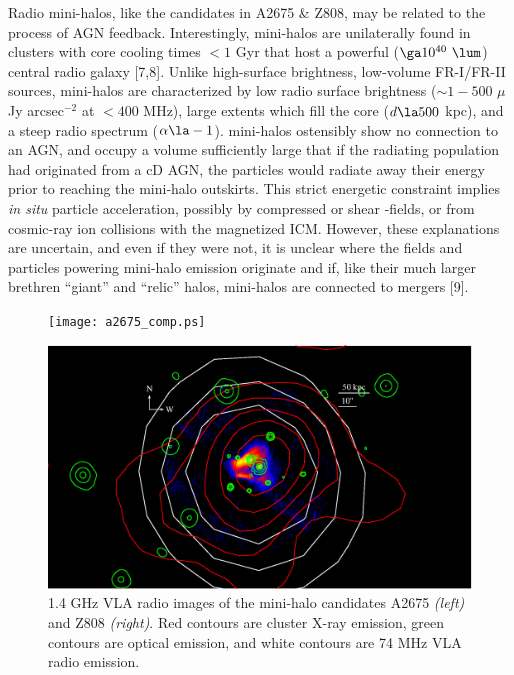 \documentclass[letterpaper,11pt]{article}
\begin{document}
Radio mini-halos, like the candidates in A2675 \& Z808, may be related to the
process of AGN feedback. Interestingly, mini-halos are unilaterally found in
clusters with core cooling times $< 1$ Gyr that host a powerful ($\ga
10^{40} ~\lum$) central radio galaxy [7,8]. Unlike high-surface
brightness, low-volume FR-I/FR-II sources, mini-halos are characterized by
low radio surface brightness ($\sim 1-500$ $\mu$Jy arcsec$^{-2}$ at $<
400$ MHz), large extents which fill the core ($d \la 500$ kpc), and a
steep radio spectrum ($\alpha \la -1$). mini-halos ostensibly show no
connection to an AGN, and occupy a volume sufficiently large that if
the radiating population had originated from a cD AGN, the particles
would radiate away their energy prior to reaching the mini-halo
outskirts. This strict energetic constraint implies {\it{in situ}}
particle acceleration, possibly by compressed or shear \bmag-fields,
or from cosmic-ray ion collisions with the magnetized ICM. However,
these explanations are uncertain, and even if they were not, it is
unclear where the fields and particles powering mini-halo emission originate
and if, like their much larger brethren ``giant'' and ``relic'' halos,
mini-halos are connected to mergers [9].
\begin{figure}[ht]
  \begin{center}
    \begin{minipage}{0.495\columnwidth}
      \texttt{[image: a2675\_comp.ps]}
    \end{minipage}
    \begin{minipage}{0.495\columnwidth}
      \includegraphics*[width=\columnwidth, trim=42mm 15mm 45mm 15mm, clip]{zw808_comp.ps}
    \end{minipage}
    \caption{1.4 GHz VLA radio images of the mini-halo candidates
      A2675 {\it{(left)}} and Z808 {\it{(right)}}. Red contours are
      cluster X-ray emission, green contours are optical emission, and
      white contours are 74 MHz VLA radio emission.}
    \label{fig:img}
  \end{center}
  \vspace{-22pt}
\end{figure}
\end{document}
